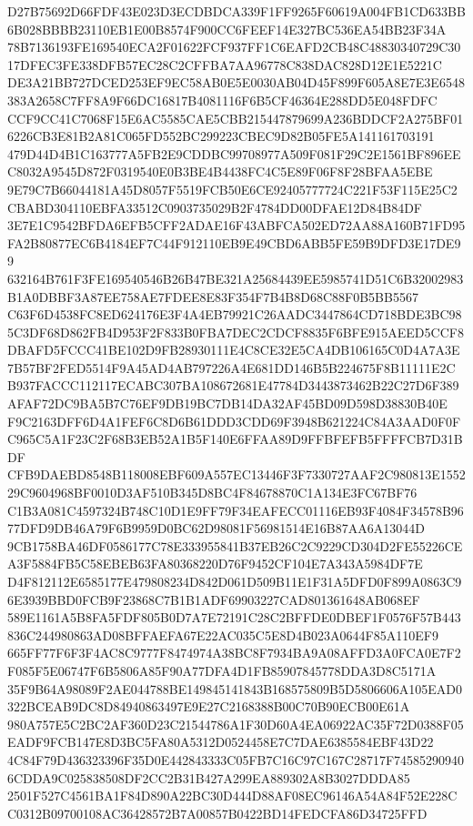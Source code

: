 \documentclass[UTF8,fontset=fandol,zihao=-4,a4paper]{ctexart}
\begin{document}
{{D27B75692D66FDF43E023D3ECDBDCA339F1FF9265F60619A004FB1CD633BB6B028BBBB23110EB1E00B8574F900CC6FEEF14E327BC536EA54BB23F34A
78B7136193FE169540ECA2F01622FCF937FF1C6EAFD2CB48C48830340729C3017DFEC3FE338DFB57EC28C2CFFBA7AA96778C838DAC828D12E1E5221C
DE3A21BB727DCED253EF9EC58AB0E5E0030AB04D45F899F605A8E7E3E6548383A2658C7FF8A9F66DC16817B4081116F6B5CF46364E288DD5E048FDFC
CCF9CC41C7068F15E6AC5585CAE5CBB215447879699A236BDDCF2A275BF016226CB3E81B2A81C065FD552BC299223CBEC9D82B05FE5A141161703191
479D44D4B1C163777A5FB2E9CDDBC99708977A509F081F29C2E1561BF896EEC8032A9545D872F0319540E0B3BE4B4438FC4C5E89F06F8F28BFAA5EBE
9E79C7B66044181A45D8057F5519FCB50E6CE92405777724C221F53F115E25C2CBABD304110EBFA33512C0903735029B2F4784DD00DFAE12D84B84DF
3E7E1C9542BFDA6EFB5CFF2ADAE16F43ABFCA502ED72AA88A160B71FD95FA2B80877EC6B4184EF7C44F912110EB9E49CBD6ABB5FE59B9DFD3E17DE99
632164B761F3FE169540546B26B47BE321A25684439EE5985741D51C6B32002983B1A0DBBF3A87EE758AE7FDEE8E83F354F7B4B8D68C88F0B5BB5567
C63F6D4538FC8ED624176E3F4A4EB79921C26AADC3447864CD718BDE3BC985C3DF68D862FB4D953F2F833B0FBA7DEC2CDCF8835F6BFE915AEED5CCF8
DBAFD5FCCC41BE102D9FB28930111E4C8CE32E5CA4DB106165C0D4A7A3E7B57BF2FED5514F9A45AD4AB797226A4E681DD146B5B224675F8B11111E2C
B937FACCC112117ECABC307BA108672681E47784D3443873462B22C27D6F389AFAF72DC9BA5B7C76EF9DB19BC7DB14DA32AF45BD09D598D38830B40E
F9C2163DFF6D4A1FEF6C8D6B61DDD3CDD69F3948B621224C84A3AAD0F0FC965C5A1F23C2F68B3EB52A1B5F140E6FFAA89D9FFBFEFB5FFFFCB7D31BDF
CFB9DAEBD8548B118008EBF609A557EC13446F3F7330727AAF2C980813E155229C9604968BF0010D3AF510B345D8BC4F84678870C1A134E3FC67BF76
C1B3A081C4597324B748C10D1E9FF79F34EAFECC01116EB93F4084F34578B9677DFD9DB46A79F6B9959D0BC62D98081F56981514E16B87AA6A13044D
9CB1758BA46DF0586177C78E333955841B37EB26C2C9229CD304D2FE55226CEA3F5884FB5C58EBEB63FA80368220D76F9452CF104E7A343A5984DF7E
D4F812112E6585177E479808234D842D061D509B11E1F31A5DFD0F899A0863C96E3939BBD0FCB9F23868C7B1B1ADF69903227CAD801361648AB068EF
589E1161A5B8FA5FDF805B0D7A7E72191C28C2BFFDE0DBEF1F0576F57B443836C244980863AD08BFFAEFA67E22AC035C5E8D4B023A0644F85A110EF9
665FF77F6F3F4AC8C9777F8474974A38BC8F7934BA9A08AFFD3A0FCA0E7F2F085F5E06747F6B5806A85F90A77DFA4D1FB85907845778DDA3D8C5171A
35F9B64A98089F2AE044788BE149845141843B168575809B5D5806606A105EAD0322BCEAB9DC8D84940863497E9E27C2168388B00C70B90ECB00E61A
980A757E5C2BC2AF360D23C21544786A1F30D60A4EA06922AC35F72D0388F05EADF9FCB147E8D3BC5FA80A5312D0524458E7C7DAE6385584EBF43D22
4C84F79D436323396F35D0E442843333C05FB7C16C97C167C28717F745852909406CDDA9C025838508DF2CC2B31B427A299EA889302A8B3027DDDA85
2501F527C4561BA1F84D890A22BC30D444D88AF08EC96146A54A84F52E228CC0312B09700108AC36428572B7A00857B0422BD14FEDCFA86D34725FFD
}}
\end{document}
